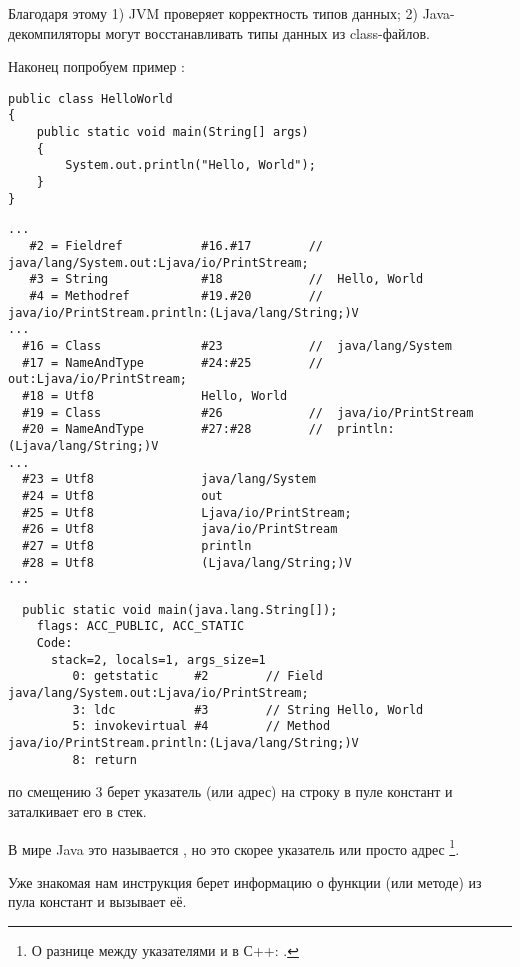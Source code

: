 Благодаря этому
1) JVM проверяет корректность типов данных; 
2) Java-декомпиляторы могут восстанавливать типы данных из class-файлов.


Наконец попробуем пример :

\begin{lstlisting}
public class HelloWorld
{
	public static void main(String[] args)
	{
		System.out.println("Hello, World");
	}
}
\end{lstlisting}

\begin{lstlisting}[caption=Constant pool]
...
   #2 = Fieldref           #16.#17        //  java/lang/System.out:Ljava/io/PrintStream;
   #3 = String             #18            //  Hello, World
   #4 = Methodref          #19.#20        //  java/io/PrintStream.println:(Ljava/lang/String;)V
...
  #16 = Class              #23            //  java/lang/System
  #17 = NameAndType        #24:#25        //  out:Ljava/io/PrintStream;
  #18 = Utf8               Hello, World
  #19 = Class              #26            //  java/io/PrintStream
  #20 = NameAndType        #27:#28        //  println:(Ljava/lang/String;)V
...
  #23 = Utf8               java/lang/System
  #24 = Utf8               out
  #25 = Utf8               Ljava/io/PrintStream;
  #26 = Utf8               java/io/PrintStream
  #27 = Utf8               println
  #28 = Utf8               (Ljava/lang/String;)V
...
\end{lstlisting}

\begin{lstlisting}
  public static void main(java.lang.String[]);
    flags: ACC_PUBLIC, ACC_STATIC
    Code:
      stack=2, locals=1, args_size=1
         0: getstatic     #2        // Field java/lang/System.out:Ljava/io/PrintStream;
         3: ldc           #3        // String Hello, World
         5: invokevirtual #4        // Method java/io/PrintStream.println:(Ljava/lang/String;)V
         8: return        
\end{lstlisting}


 по смещению 3 берет указатель (или адрес) на строку 
в пуле констант и заталкивает его в стек.

В мире Java это называется , но это скорее указатель или просто адрес
\footnote{О разнице между указателями и  в С++: .}.


Уже знакомая нам инструкция  берет информацию о функции (или методе)  
из пула констант и вызывает её.

